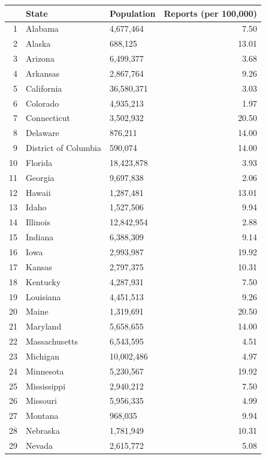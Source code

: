 \documentclass{article}
\begin{document}
  
\begin{table}[ht]
\centering
\begin{tabular}{rllr}
  \hline
 & State & Population & Reports (per 100,000) \\ 
  \hline
1 & Alabama & 4,677,464 & 7.50 \\ 
  2 & Alaska & 688,125 & 13.01 \\ 
  3 & Arizona & 6,499,377 & 3.68 \\ 
  4 & Arkansas & 2,867,764 & 9.26 \\ 
  5 & California & 36,580,371 & 3.03 \\ 
  6 & Colorado & 4,935,213 & 1.97 \\ 
  7 & Connecticut & 3,502,932 & 20.50 \\ 
  8 & Delaware & 876,211 & 14.00 \\ 
  9 & District of Columbia & 590,074 & 14.00 \\ 
  10 & Florida & 18,423,878 & 3.93 \\ 
  11 & Georgia & 9,697,838 & 2.06 \\ 
  12 & Hawaii & 1,287,481 & 13.01 \\ 
  13 & Idaho & 1,527,506 & 9.94 \\ 
  14 & Illinois & 12,842,954 & 2.88 \\ 
  15 & Indiana & 6,388,309 & 9.14 \\ 
  16 & Iowa & 2,993,987 & 19.92 \\ 
  17 & Kansas & 2,797,375 & 10.31 \\ 
  18 & Kentucky & 4,287,931 & 7.50 \\ 
  19 & Louisiana & 4,451,513 & 9.26 \\ 
  20 & Maine & 1,319,691 & 20.50 \\ 
  21 & Maryland & 5,658,655 & 14.00 \\ 
  22 & Massachusetts & 6,543,595 & 4.51 \\ 
  23 & Michigan & 10,002,486 & 4.97 \\ 
  24 & Minnesota & 5,230,567 & 19.92 \\ 
  25 & Mississippi & 2,940,212 & 7.50 \\ 
  26 & Missouri & 5,956,335 & 4.99 \\ 
  27 & Montana & 968,035 & 9.94 \\ 
  28 & Nebraska & 1,781,949 & 10.31 \\ 
  29 & Nevada & 2,615,772 & 5.08 \\ 

\end{tabular}
\end{table}
\end{document}
